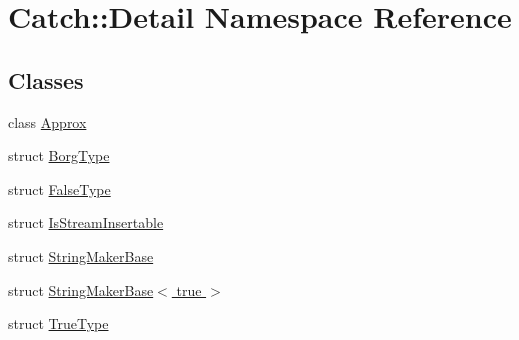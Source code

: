 \hypertarget{namespace_catch_1_1_detail}{}\section{Catch\+:\+:Detail Namespace Reference}
\label{namespace_catch_1_1_detail}
\subsection*{Classes}
\begin{DoxyCompactItemize}
\item 
class \hyperlink{class_catch_1_1_detail_1_1_approx}{Approx}
\item 
struct \hyperlink{struct_catch_1_1_detail_1_1_borg_type}{Borg\+Type}
\item 
struct \hyperlink{struct_catch_1_1_detail_1_1_false_type}{False\+Type}
\item 
struct \hyperlink{struct_catch_1_1_detail_1_1_is_stream_insertable}{Is\+Stream\+Insertable}
\item 
struct \hyperlink{struct_catch_1_1_detail_1_1_string_maker_base}{String\+Maker\+Base}
\item 
struct \hyperlink{struct_catch_1_1_detail_1_1_string_maker_base_3_01true_01_4}{String\+Maker\+Base$<$ true $>$}
\item 
struct \hyperlink{struct_catch_1_1_detail_1_1_true_type}{True\+Type}
\end{DoxyCompactItemize}
